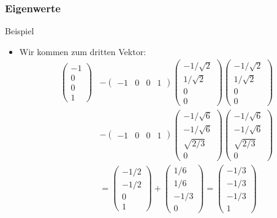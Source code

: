\documentclass{beamer}
\newcommand{\mytitle}{Eigenwerte}
\begin{document}
\begin{frame}\frametitle{\mytitle}
	\begin{block}{Beispiel}
	\begin{itemize}
		\item Wir kommen zum dritten Vektor:	
			\begin{align*}
			\begin{pmatrix} -1\\0\\0\\1 \end{pmatrix}
			&-\begin{pmatrix} -1&0&0&1 \end{pmatrix}\begin{pmatrix} -1/\sqrt 2\\1/\sqrt 2\\0\\0 \end{pmatrix}\begin{pmatrix} -1/\sqrt 2\\1/\sqrt 2\\0\\0 \end{pmatrix}\\
			&-\begin{pmatrix} -1&0&0&1 \end{pmatrix}\begin{pmatrix}-1/\sqrt 6\\-1/\sqrt 6\\\sqrt{2/3}\\0\end{pmatrix}\begin{pmatrix}-1/\sqrt 6\\-1/\sqrt 6\\\sqrt{2/3}\\0\end{pmatrix}\\
			&=\begin{pmatrix}-1/2\\-1/2\\0\\1 \end{pmatrix}+\begin{pmatrix}1/6\\1/6\\-1/3\\0\end{pmatrix}
			=\begin{pmatrix}-1/3\\-1/3\\-1/3\\1 \end{pmatrix}
			\end{align*}
	\end{itemize}
	\end{block}
\end{frame}
\end{document}
